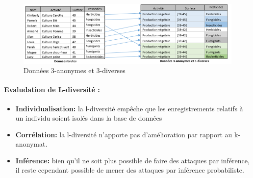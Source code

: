 \begin{figure}[!h]
    \centering
      
   \includegraphics[width=1\textwidth]{images/anonymisation/l_divers_image2.png}
    \caption{Données 3-anonymes et 3-diverses }
     \label{fig:Données 3-anonymes et 3-diverses}
\end{figure}

\paragraph{Evaludation de L-diversité : }
\begin{itemize}
    \item \textbf{Individualisation:} la l-diversité empêche que les enregistrements relatifs à un individu soient isolés dans la base de données 

   \item \textbf{Corrélation:} la l-diversité n’apporte pas d’amélioration par rapport au k-anonymat.  

   \item \textbf{Inférence:} bien qu’il ne soit plus possible de faire des attaques par inférence, il reste cependant possible de mener des attaques par inférence probabiliste. 
\end{itemize}



